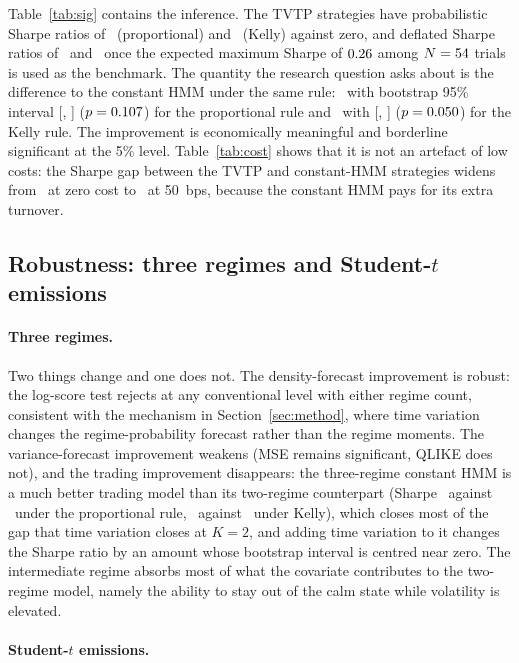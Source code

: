 \documentclass[11pt,a4paper]{article}
\begin{document}
Table~\ref{tab:sig} contains the inference. The TVTP strategies have probabilistic Sharpe ratios of \PSR\ (proportional) and \PSRK\ (Kelly) against zero, and deflated Sharpe ratios of \DSR\ and \DSRK\ once the expected maximum Sharpe of $0.26$ among $N=54$ trials is used as the benchmark. The quantity the research question asks about is the difference to the constant HMM under the same rule: \BootDiff\ with bootstrap 95\% interval [\BootLo, \BootHi] ($p=0.107$) for the proportional rule and \BootDiffK\ with [\BootLoK, \BootHiK] ($p=0.050$) for the Kelly rule. The improvement is economically meaningful and borderline significant at the 5\% level. Table~\ref{tab:cost} shows that it is not an artefact of low costs: the Sharpe gap between the TVTP and constant-HMM strategies widens from \GapZero\ at zero cost to \GapFifty\ at 50~bps, because the constant HMM pays for its extra turnover.

\subsection{Robustness: three regimes and Student-$t$ emissions}\label{sec:robust}
\paragraph{Three regimes.} \KthreeText

Two things change and one does not. The density-forecast improvement is robust: the log-score test rejects at any conventional level with either regime count, consistent with the mechanism in Section~\ref{sec:method}, where time variation changes the regime-probability forecast rather than the regime moments. The variance-forecast improvement weakens (MSE remains significant, QLIKE does not), and the trading improvement disappears: the three-regime constant HMM is a much better trading model than its two-regime counterpart (Sharpe \KthreeSRhmm\ against \SRhmm\ under the proportional rule, \KthreeSRhmmK\ against \SRhmmK\ under Kelly), which closes most of the gap that time variation closes at $K=2$, and adding time variation to it changes the Sharpe ratio by an amount whose bootstrap interval is centred near zero. The intermediate regime absorbs most of what the covariate contributes to the two-regime model, namely the ability to stay out of the calm state while volatility is elevated.

\paragraph{Student-$t$ emissions.} \StudentTText
\end{document}
